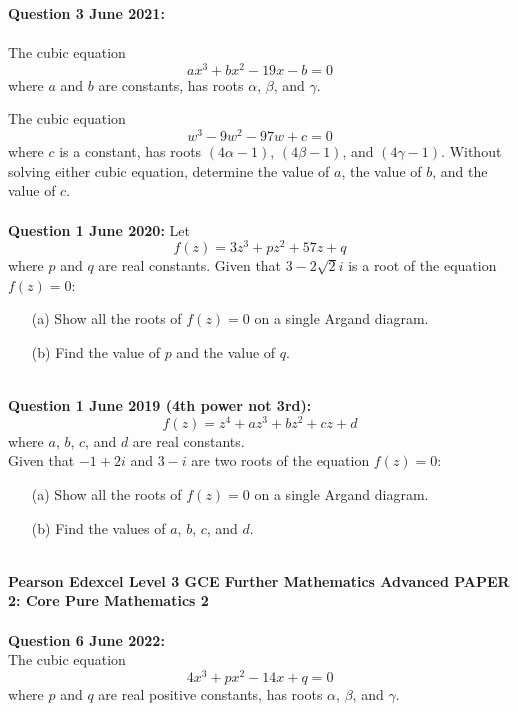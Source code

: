 \documentclass[12pt]{article}
\begin{document}
\textbf{Question 3 June 2021:}\\\\
The cubic equation
\[ax^3 + bx^2 - 19x - b = 0\]
where \( a \) and \( b \) are constants, has roots \( \alpha \), \( \beta \), and \( \gamma \).

The cubic equation
\[w^3 - 9w^2 - 97w + c = 0\]
where \( c \) is a constant, has roots \( (4\alpha - 1) \), \( (4\beta - 1) \), and \( (4\gamma - 1) \).
Without solving either cubic equation, determine the value of \( a \), the value of \( b \), and the value of \( c \).\\\\

\textbf{Question 1 June 2020:}
Let 
\[f(z) = 3z^3 + pz^2 + 57z + q\]
where \( p \) and \( q \) are real constants. Given that \( 3 - 2\sqrt{2}i \) is a root of the equation \( f(z) = 0 \):
\begin{enumerate}
    \item[(a)] Show all the roots of \( f(z) = 0 \) on a single Argand diagram.    
    \item[(b)] Find the value of \( p \) and the value of \( q \).\\\\
\end{enumerate}

\textbf{Question 1 June 2019 (4th power not 3rd):}
\[f(z) = z^4 + az^3 + bz^2 + cz + d\] where \( a \), \( b \), \( c \), and \( d \) are real constants.\\
Given that \( -1 + 2i \) and \( 3 - i \) are two roots of the equation \( f(z) = 0 \):

\begin{enumerate}
    \item[(a)] Show all the roots of \( f(z) = 0 \) on a single Argand diagram.
    \item[(b)] Find the values of \( a \), \( b \), \( c \), and \( d \).\\\\
\end{enumerate}

\textbf{Pearson Edexcel Level 3 GCE Further Mathematics
Advanced PAPER 2: Core Pure Mathematics 2}\\\\

\textbf{Question 6 June 2022:}\\
The cubic equation
\[4x^3 + px^2 - 14x + q = 0\]
where \( p \) and \( q \) are real positive constants, has roots \( \alpha \), \( \beta \), and \( \gamma \).
\end{document}
